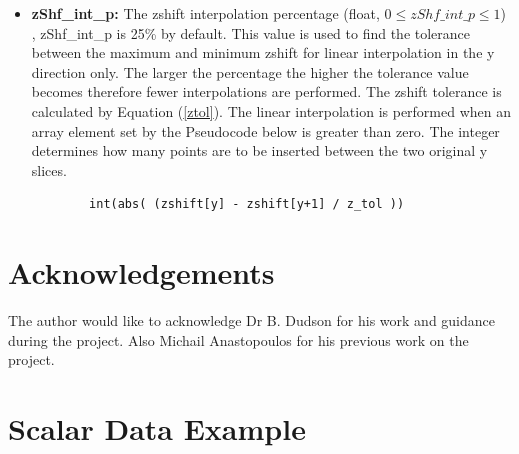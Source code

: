 \documentclass[12pt,a4paper]{article}
\begin{document}
\begin{itemize}
	\item{\textbf{zShf\_int\_p:} The zshift interpolation percentage (float, $0\leq zShf\_int\_p \leq 1 $) , zShf\_int\_p is 25\% by default. This value is used to find the tolerance between the maximum and minimum zshift for linear interpolation in the y direction only. The larger the percentage the higher the tolerance value becomes therefore fewer interpolations are performed. The zshift tolerance is calculated by Equation (\ref{ztol}). The linear interpolation is performed when an array element set by the Pseudocode below is greater than zero. The integer determines how many points are to be inserted between the two original y slices.
					
					
	\begin{verbatim}
		int(abs( (zshift[y] - zshift[y+1] / z_tol ))
	\end{verbatim}} 
				
\end{itemize}


\section{Acknowledgements}
The author would like to acknowledge Dr B. Dudson for his work and guidance during the project. Also Michail Anastopoulos for his previous work on the project.

\appendix

\section{Scalar Data Example}
\label{example:scalar}
\end{document}
